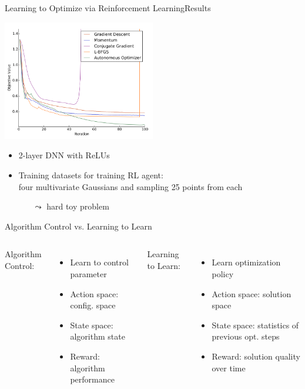 \begin{frame}[c]{Learning to Optimize via Reinforcement Learning\newline Results }

\centering
\includegraphics[width=0.5\textwidth]{images/l2o_dnn}

\begin{itemize}
  \item 2-layer DNN with ReLUs
  \item Training datasets for training RL agent:\\ four multivariate Gaussians and sampling 25 points from each
  \begin{itemize}
    \item[$\leadsto$] hard toy problem
  \end{itemize}
\end{itemize}

\end{frame}
\begin{frame}[c]{Algorithm Control vs. Learning to Learn}


\begin{columns}


\alert{Algorithm Control:}

\begin{itemize}
  \item Learn to control parameter
  \item Action space: config. space
  \item State space: algorithm state
  \newline
  \item Reward: algorithm performance
\end{itemize}


\alert{Learning to Learn:}

\begin{itemize}
  \item Learn optimization policy 
  \item Action space: solution space
  \item State space: statistics of previous opt. steps
  \item Reward: solution quality over time
\end{itemize}


\end{columns}


\end{frame}
